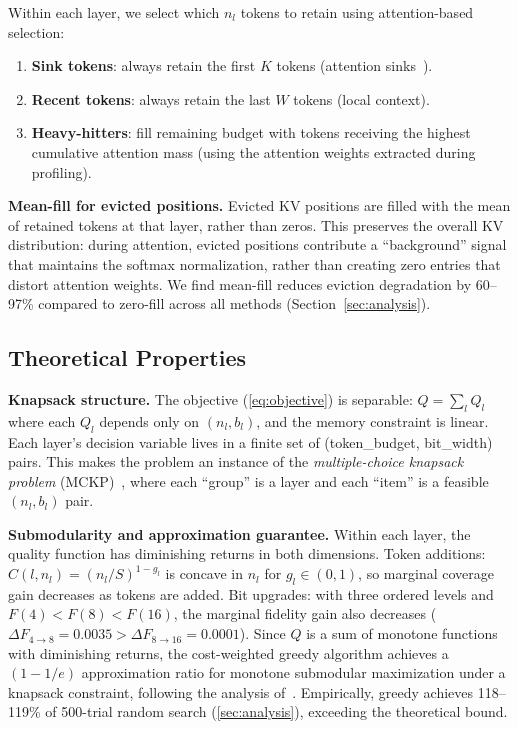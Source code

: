 \documentclass{article}
\begin{document}
Within each layer, we select which $n_l$ tokens to retain using attention-based selection:
\begin{enumerate}
    \item \textbf{Sink tokens}: always retain the first $K$ tokens (attention sinks~\citep{xiao2024efficient}).
    \item \textbf{Recent tokens}: always retain the last $W$ tokens (local context).
    \item \textbf{Heavy-hitters}: fill remaining budget with tokens receiving the highest cumulative attention mass (using the attention weights extracted during profiling).
\end{enumerate}
\textbf{Mean-fill for evicted positions.}
Evicted KV positions are filled with the mean of retained tokens at that layer, rather than zeros.
This preserves the overall KV distribution: during attention, evicted positions contribute a ``background'' signal that maintains the softmax normalization, rather than creating zero entries that distort attention weights.
We find mean-fill reduces eviction degradation by 60--97\% compared to zero-fill across all methods (Section~\ref{sec:analysis}).

\subsection{Theoretical Properties}
\label{sec:theory}

\textbf{Knapsack structure.}
The objective (\cref{eq:objective}) is separable: $Q = \sum_l Q_l$ where each $Q_l$ depends only on $(n_l, b_l)$, and the memory constraint is linear.
Each layer's decision variable lives in a finite set of (token\_budget, bit\_width) pairs.
This makes the problem an instance of the \emph{multiple-choice knapsack problem} (MCKP)~\citep{kellerer2004knapsack}, where each ``group'' is a layer and each ``item'' is a feasible $(n_l, b_l)$ pair.

\textbf{Submodularity and approximation guarantee.}
Within each layer, the quality function has diminishing returns in both dimensions.
Token additions: $C(l, n_l) = (n_l/S)^{1-g_l}$ is concave in $n_l$ for $g_l \in (0,1)$, so marginal coverage gain decreases as tokens are added.
Bit upgrades: with three ordered levels and $F(4) < F(8) < F(16)$, the marginal fidelity gain also decreases ($\Delta F_{4\to 8} = 0.0035 > \Delta F_{8\to 16} = 0.0001$).
Since $Q$ is a sum of monotone functions with diminishing returns, the cost-weighted greedy algorithm achieves a $(1-1/e)$ approximation ratio for monotone submodular maximization under a knapsack constraint, following the analysis of~\citet{sviridenko2004note}.
Empirically, greedy achieves 118--119\% of 500-trial random search (\cref{sec:analysis}), exceeding the theoretical bound.
\end{document}

